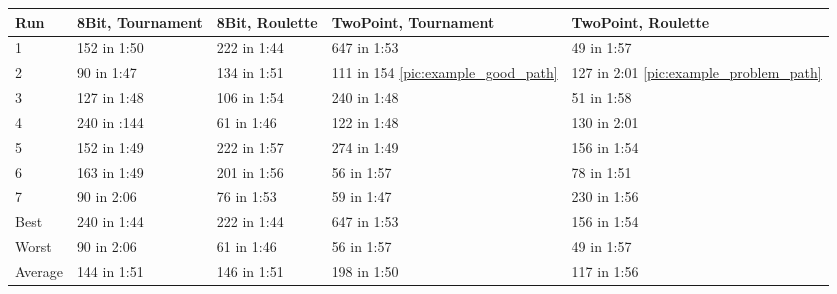 \begin{center}
	\begin{tabular}{| l | l | l | p{3cm} | p{3cm}|}
		\hline
		Run 		& 8Bit, Tournament 	& 8Bit, Roulette 	& TwoPoint, Tournament 	& TwoPoint, Roulette	\\ \hline
		1				&	152 in 1:50				&	222 in 1:44			&	647 in 1:53						&	49 in 1:57					\\ \hline
		2				&	90 in 1:47				&	134 in 1:51			& 111 in 154 \ref{pic:example_good_path}			&	127 in 2:01 \ref{pic:example_problem_path}	\\ \hline		
		3				&	127 in 1:48				&	106 in 1:54			& 240 in 1:48						& 51 in 1:58					\\ \hline
		4				&	240 in :144				&	61 in 1:46			& 122 in 1:48						& 130 in 2:01					\\ \hline
		5				&	152 in 1:49				&	222 in 1:57			&	274 in 1:49						&	156 in 1:54					\\ \hline
		6				&	163 in 1:49				& 201 in 1:56			&	56 in 1:57						& 78 in 1:51					\\ \hline
		7				&	90 in 2:06				&	76 in 1:53			& 59 in 1:47						& 230 in 1:56					\\ \hline
		Best		&	240 in 1:44				&	222 in 1:44			&	647 in 1:53						&	156 in 1:54					\\ \hline
		Worst		&	90 in 2:06				&	61 in 1:46			&	56 in 1:57						& 49 in 1:57					\\ \hline
		Average	&	144 in 1:51				& 146 in 1:51			& 198 in 1:50						&	117 in 1:56					\\ \hline
		\hline
	\end{tabular}
\end{center}